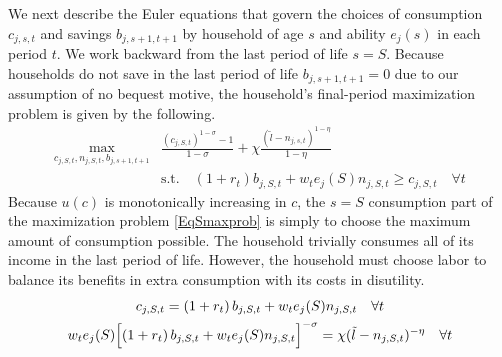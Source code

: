 \documentclass[letterpaper,12pt]{article}
\theoremstyle{definition}
\begin{document}
\begin{spacing}{1.5}
    We next describe the Euler equations that govern the choices of consumption $c_{j,s,t}$ and savings $b_{j,s+1,t+1}$ by household of age $s$ and ability $e_j(s)$ in each period $t$. We work backward from the last period of life $s = S$. Because households do not save in the last period of life $b_{j,s+1,t+1}=0$ due to our assumption of no bequest motive, the household's final-period maximization problem is given by the following.
    \begin{equation}\label{EqSmaxprob}
      \begin{split}
        \max_{c_{j,S,t},n_{j,S,t},b_{j,s+1,t+1}} &\frac{\left(c_{j,S,t}\right)^{1-\sigma} - 1}{1 - \sigma} + \chi\frac{(\tilde{l}-n_{j,s,t})^{1-\eta}}{1-\eta} \\
        &\text{s.t.} \quad \left(1+r_t\right)b_{j,S,t} + w_t e_j(S)n_{j,S,t} \geq c_{j,S,t} \quad \forall t
      \end{split}
    \end{equation}
    Because $u(c)$ is monotonically increasing in $c$, the $s=S$ consumption part of the maximization problem \eqref{EqSmaxprob} is simply to choose the maximum amount of consumption possible. The household trivially consumes all of its income in the last period of life. However, the household must choose labor to balance its benefits in extra consumption with its costs in disutility.
    \begin{gather}
      c_{j,S,t} = \left(1+r_t\right)b_{j,S,t} + w_t e_j(S)n_{j,S,t} \quad \forall t \label{EqScons} \\
      w_t e_j(S)\Bigl[\left(1+r_t\right)b_{j,S,t} + w_t e_j(S)n_{j,S,t}\Bigr]^{-\sigma} = \chi(\tilde{l} - n_{j,S,t})^{-\eta} \quad\forall t \label{EqEulerSlab}
    \end{gather}


\end{spacing}
\end{document}
